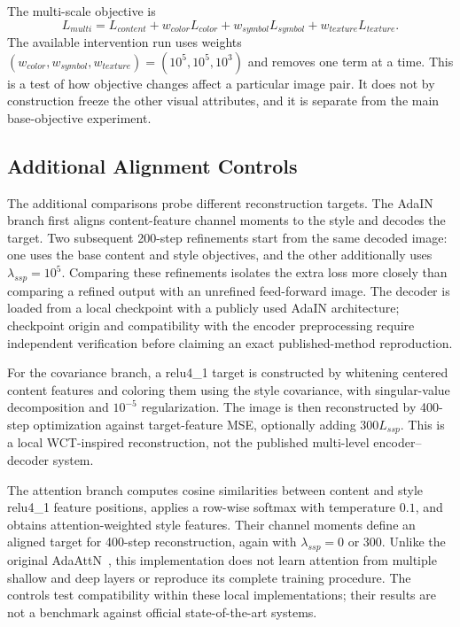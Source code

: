 \documentclass[manuscript,acmlarge,screen,review]{acmart}
\begin{document}
The multi-scale objective is
\begin{equation}
L_{multi}=L_{content}+w_{color}L_{color}+w_{symbol}L_{symbol}+w_{texture}L_{texture}.
\end{equation}
The available intervention run uses weights $(w_{color},w_{symbol},w_{texture})=(10^5,10^5,10^3)$ and removes one term at a time. This is a test of how objective changes affect a particular image pair. It does not by construction freeze the other visual attributes, and it is separate from the main base-objective experiment.

\subsection{Additional Alignment Controls}
The additional comparisons probe different reconstruction targets. The AdaIN branch first aligns content-feature channel moments to the style and decodes the target. Two subsequent 200-step refinements start from the same decoded image: one uses the base content and style objectives, and the other additionally uses $\lambda_{ssp}=10^5$. Comparing these refinements isolates the extra loss more closely than comparing a refined output with an unrefined feed-forward image. The decoder is loaded from a local checkpoint with a publicly used AdaIN architecture; checkpoint origin and compatibility with the encoder preprocessing require independent verification before claiming an exact published-method reproduction.

For the covariance branch, a relu4\_1 target is constructed by whitening centered content features and coloring them using the style covariance, with singular-value decomposition and $10^{-5}$ regularization. The image is then reconstructed by 400-step optimization against target-feature MSE, optionally adding $300L_{ssp}$. This is a local WCT-inspired reconstruction, not the published multi-level encoder--decoder system.

The attention branch computes cosine similarities between content and style relu4\_1 feature positions, applies a row-wise softmax with temperature $0.1$, and obtains attention-weighted style features. Their channel moments define an aligned target for 400-step reconstruction, again with $\lambda_{ssp}=0$ or $300$. Unlike the original AdaAttN~\cite{liu2021}, this implementation does not learn attention from multiple shallow and deep layers or reproduce its complete training procedure. The controls test compatibility within these local implementations; their results are not a benchmark against official state-of-the-art systems.
\end{document}
